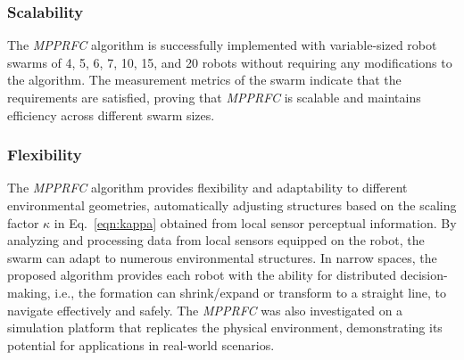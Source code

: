 \subsubsection{Scalability}
The \textit{MPPRFC} algorithm is successfully implemented with variable-sized robot swarms of 4, 5, 6, 7, 10, 15, and 20 robots without requiring any modifications to the algorithm. The measurement metrics of the swarm indicate that the requirements are satisfied, proving that \textit{MPPRFC} is scalable and maintains efficiency across different swarm sizes. 

\subsubsection{Flexibility}
The \textit{MPPRFC} algorithm provides flexibility and adaptability to different environmental geometries, automatically adjusting structures based on the scaling factor $\kappa$ in Eq.~\eqref{eqn:kappa} obtained from local sensor perceptual information. By analyzing and processing data from local sensors equipped on the robot, the swarm can adapt to numerous environmental structures. In narrow spaces, the proposed algorithm provides each robot with the ability for distributed decision-making, i.e., the formation can shrink/expand or transform to a straight line, to navigate effectively and safely. The \textit{MPPRFC} was also investigated on a simulation platform that replicates the physical environment, demonstrating its potential for applications in real-world scenarios.